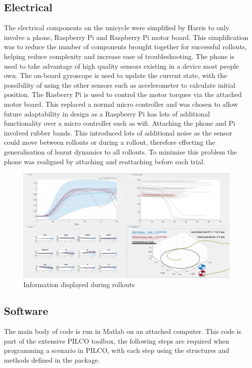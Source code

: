 \documentclass[twoside,twocolumn,12pt]{article}
\begin{document}
\subsection{Electrical}
The electrical components on the unicycle were simplified by Harris \cite{arsalan} to only involve a phone, Raspberry Pi and Raspberry Pi motor board. This simplification was to reduce the number of components brought together for successful rollouts, helping reduce complexity and increase ease of troubleshooting. 
\newline
The phone is used to take advantage of high quality sensors existing in a device most people own. The on-board gyroscope is used to update the current state, with the possibility of using the other sensors such as accelerometer to calculate initial position. 
\newline
The Rasberry Pi is used to control the motor torques via the attached motor board. This replaced a normal micro controller and was chosen to allow future adaptability in design as a Raspberry Pi has lots of additional functionality over a micro controller such as wifi.
\newline
Attaching the phone and Pi involved rubber bands. This introduced lots of additional noise as the sensor could move between rollouts or during a rollout, therefore effecting the generalisation of learnt dynamics to all rollouts. To minimise this problem the phone was realigned by attaching and reattaching before each trial. 
\begin{figure}[t!]
  \centering
    \includegraphics[width=\linewidth]{pilco}
   \caption{Information displayed during rollouts}
  \label{fig:pilcoscreen}
\end{figure}
\subsection{Software}
The main body of code is run in Matlab on an attached computer. This code is part of the extensive PILCO toolbox, the following steps are required when programming a scenario in PILCO, with each step using the structures and methods defined in the package.
\end{document}

